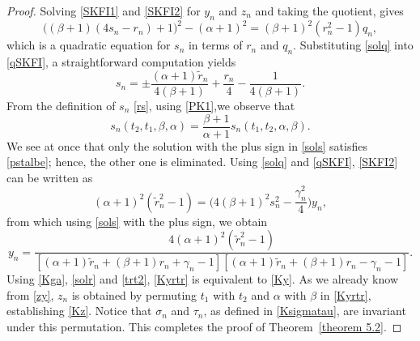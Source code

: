 \documentclass[10pt,a4paper]{amsart}
\begin{document}
\begin{proof}
Solving \eqref{SKFI1} and \eqref{SKFI2} for $y_n$ and $z_n$ and taking the quotient, gives 
\begin{equation} \label{qSKFI}
\big((\beta+1)(4s_n-r_n)+1\big)^2-(\alpha+1)^2=(\beta+1)^2(r_n^2-1)q_n,
\end{equation}
which is a quadratic equation for $s_n$ in terms of $r_n$ and $q_n$. Substituting \eqref{solq} into \eqref{qSKFI}, a straightforward computation yields
\begin{equation} 
s_n=\pm \frac{(\alpha+1)\tilde{r}_n}{4(\beta+1)} +\frac{r_n}{4}-\frac{1}{4(\beta+1)}.\label{sols}
\end{equation}
From the definition of $s_n$ \eqref{rs}, using \eqref{PK1},we observe that
\begin{equation}
s_n(t_2,t_1,\beta,\alpha)=\frac{\beta+1}{\alpha+1} s_n(t_1,t_2,\alpha,\beta).\label{pstalbe} 
\end{equation}
We see at once that only the solution with the plus sign in \eqref{sols} satisfies \eqref{pstalbe}; hence, the other one is eliminated. Using \eqref{solq} and \eqref{qSKFI}, \eqref{SKFI2} can be written as
\begin{equation*}
(\alpha+1)^2(\tilde{r}_n^2-1)=\Big(4(\beta+1)^2s_n^2-\frac{\gamma_n^2}{4}\Big)y_n,
\end{equation*}
from which using \eqref{sols} with the plus sign, we obtain 
\begin{equation}
y_n=\frac{4(\alpha+1)^2(\tilde{r}_n^2-1)}{[(\alpha+1)\tilde{r}_n+(\beta+1)r_n+\gamma_n-1][(\alpha+1)\tilde{r}_n+(\beta+1)r_n-\gamma_n-1]}.\label{Kyrtr}
\end{equation}
Using \eqref{Kga}, \eqref{solr} and \eqref{trt2}, \eqref{Kyrtr} is equivalent to \eqref{Ky}. As we already know from \eqref{zy}, $z_n$ is obtained by permuting $t_1$ with $t_2$ and $\alpha$ with $\beta$ in \eqref{Kyrtr}, establishing \eqref{Kz}. Notice that $\sigma_n$ and $\tau_n$, as defined in \eqref{Ksigmatau}, are invariant under this permutation. This completes the proof of Theorem~\ref{theorem 5.2}.
\end{proof}
\end{document}
